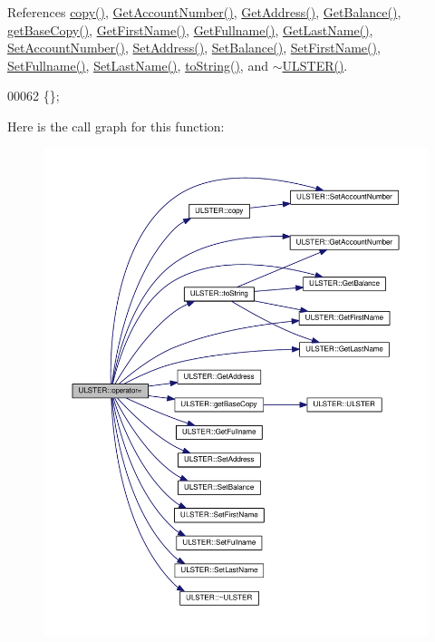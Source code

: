 References \hyperlink{_u_l_s_t_e_r_8cpp_source_l00037}{copy()}, \hyperlink{_u_l_s_t_e_r_8cpp_source_l00083}{Get\+Account\+Number()}, \hyperlink{_u_l_s_t_e_r_8cpp_source_l00067}{Get\+Address()}, \hyperlink{_u_l_s_t_e_r_8cpp_source_l00075}{Get\+Balance()}, \hyperlink{_u_l_s_t_e_r_8cpp_source_l00025}{get\+Base\+Copy()}, \hyperlink{_u_l_s_t_e_r_8cpp_source_l00099}{Get\+First\+Name()}, \hyperlink{_u_l_s_t_e_r_8cpp_source_l00107}{Get\+Fullname()}, \hyperlink{_u_l_s_t_e_r_8cpp_source_l00091}{Get\+Last\+Name()}, \hyperlink{_u_l_s_t_e_r_8cpp_source_l00079}{Set\+Account\+Number()}, \hyperlink{_u_l_s_t_e_r_8cpp_source_l00063}{Set\+Address()}, \hyperlink{_u_l_s_t_e_r_8cpp_source_l00071}{Set\+Balance()}, \hyperlink{_u_l_s_t_e_r_8cpp_source_l00095}{Set\+First\+Name()}, \hyperlink{_u_l_s_t_e_r_8cpp_source_l00103}{Set\+Fullname()}, \hyperlink{_u_l_s_t_e_r_8cpp_source_l00087}{Set\+Last\+Name()}, \hyperlink{_u_l_s_t_e_r_8cpp_source_l00058}{to\+String()}, and \hyperlink{_u_l_s_t_e_r_8cpp_source_l00018}{$\sim$\+U\+L\+S\+T\+E\+R()}.


\begin{DoxyCode}
00062 \{\};
\end{DoxyCode}


Here is the call graph for this function\+:\nopagebreak
\begin{figure}[H]
\begin{center}
\leavevmode
\includegraphics[width=350pt]{class_u_l_s_t_e_r_aa096fc13a27cf4c4238af3aad8382a13_cgraph}
\end{center}
\end{figure}


